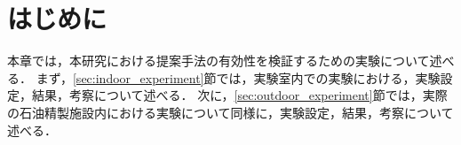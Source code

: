 \documentclass[../main]{subfiles}
\begin{document}
\section{はじめに}
\label{sec:vexp_introduction}

本章では，本研究における提案手法の有効性を検証するための実験について述べる．
まず，\ref{sec:indoor_experiment}節では，実験室内での実験における，実験設定，結果，考察について述べる．
次に，\ref{sec:outdoor_experiment}節では，実際の石油精製施設内における実験について同様に，実験設定，結果，考察について述べる．
\end{document}
